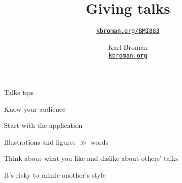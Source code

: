 \documentclass[aspectratio=169,12pt,t]{beamer}
\title{Giving talks}
\subtitle{}
\author{\href{https://kbroman.org/BMI883}{\tt kbroman.org/BMI883} }
\institute{}
\date{\small \hspace{3in} Karl Broman \\
  \hspace{3in} \href{https://kbroman.org}{\color{foreground}
    \small \tt kbroman.org}}
\begin{document}
{

\begin{frame}{Talks tips}

  \bi
\item Know your audience
\item Start with the application
\item Illustrations and figures $\gg$ words
\item Think about what you like and dislike about others' talks
\item It's risky to mimic another's style
  \ei

\end{frame}
}
\end{document}
